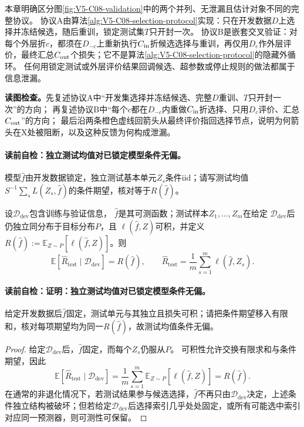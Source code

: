 本章明确区分图\ref{fig:V5-C08-validation}中的两个并列、无泄漏且估计对象不同的完整协议。
协议A由算法\ref{alg:V5-C08-selection-protocol}实现：只在开发数据$D$上选择并冻结候选，随后重训，锁定测试集$T$只开封一次。
协议B是嵌套交叉验证：对每个外层折$c$，都须在$D_{-c}$上重新执行$C_{\rm in}$折候选选择与重训，再仅用$D_c$作外层评价，最终汇总$C_{\rm out}$个损失；它不是算法\ref{alg:V5-C08-selection-protocol}的隐藏外循环。
任何用锁定测试或外层评价结果回调候选、超参数或停止规则的做法都属于信息泄漏。

\FloatBarrier
\noindent\textbf{读图检查。}先复述协议A中“开发集选择并冻结候选、完整$D$重训、$T$只开封一次”的方向；
再复述协议B中“每个$c$都在$D_{-c}$内重做$C_{\rm in}$折选择、只用$D_c$评价、汇总$C_{\rm out}$”的方向；
最后沿两条橙色虚线回箭头从最终评价指回选择节点，说明为何箭头在X处被阻断，以及这种反馈为何构成泄漏。

\paragraph{读前自检：独立测试均值对已锁定模型条件无偏。}模型$\widehat f$由开发数据锁定，独立测试基本单元$Z_s$条件iid；请写测试均值$S^{-1}\sum_sL(Z_s,\widehat f)$的条件期望，核对等于$R(\widehat f)$。\par

\begin{proposition}[独立测试均值对已锁定模型条件无偏]\label{prop:V5-C08-test-unbiased}
设$\mathcal D_{\mathrm{dev}}$包含训练与验证信息，
$\widehat f$是其可测函数；测试样本$Z_1,\ldots,Z_m$在给定
$\mathcal D_{\mathrm{dev}}$后仍独立同分布于目标分布$P$，且
$\ell(\widehat f,Z)$可积，并定义
$R(\widehat f):=\mathbb E_{Z\sim P}[\ell(\widehat f,Z)]$。则
\[
\mathbb E\!\left[\widehat R_{\mathrm{test}}\mid\mathcal D_{\mathrm{dev}}\right]
=R(\widehat f),\qquad
\widehat R_{\mathrm{test}}=\frac1m\sum_{s=1}^m\ell(\widehat f,Z_s).
\]
\end{proposition}
\paragraph{读前自检：证明：独立测试均值对已锁定模型条件无偏。}给定开发数据后$\widehat f$固定，测试单元与其独立且损失可积；请把条件期望移入有限和，核对每项期望均为同一$R(\widehat f)$，故测试均值条件无偏。\par

\begin{proof}
给定$\mathcal D_{\mathrm{dev}}$后，$\widehat f$固定，而每个$Z_s$仍服从$P$。
可积性允许交换有限求和与条件期望，因此
\[
\mathbb E[\widehat R_{\mathrm{test}}\mid\mathcal D_{\mathrm{dev}}]
=\frac1m\sum_{s=1}^m
\mathbb E_{Z\sim P}[\ell(\widehat f,Z)]
=R(\widehat f).
\]
在通常的非退化情况下，若测试结果参与候选选择，$\widehat f$不再只由$\mathcal D_{\mathrm{dev}}$决定，上述条件独立结构被破坏；但若给定$\mathcal D_{\mathrm{dev}}$后选择索引几乎处处固定，或所有可能选中索引对应同一预测器，则可测性可保留。
\end{proof}

